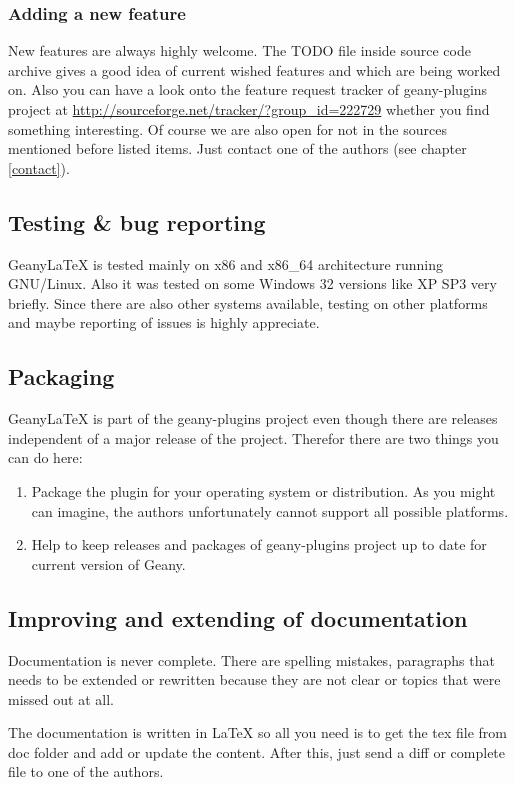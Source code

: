 \documentclass[%
a4paper,%
10pt,%
oneside,%
DIV18,
headsepline,
plainheadsepline,
footsepline,
plainfootsepline,
bibtotoc,%
liststotoc,%
BCOR12mm,%
halfparskip,%
openany,%
]{scrartcl}
\begin{document}
\subsubsection{Adding a new feature}
New features are always highly welcome. The TODO file inside source
code archive gives a good idea of current wished features and which
are being worked on. Also you can have a look onto the feature request
tracker of geany-plugins project at
\url{http://sourceforge.net/tracker/?group\_id=222729} whether you find
something interesting. Of course we are also open for not in the
sources mentioned before listed items. Just contact one of the authors
(see chapter \ref{contact}).

\subsection{Testing \& bug reporting}
Geany\LaTeX{} is tested mainly on x86 and x86\_64 architecture running
GNU/Linux. Also it was tested on some Windows 32 versions like XP SP3
very briefly. Since there are also other systems available, testing on other
platforms and maybe reporting of issues is highly appreciate.

\subsection{Packaging}
Geany\LaTeX{} is part of the geany-plugins project even though there
are releases independent of a major release of the project. Therefor
there are two things you can do here:
\begin{enumerate}
	\item Package the plugin for your operating system or
	distribution. As you might can imagine, the authors unfortunately
	cannot support all possible platforms.
	\item Help to keep releases and packages of geany-plugins project
	up to date for current version of Geany.
\end{enumerate}

\subsection{Improving and extending of documentation}
Documentation is never complete. There are spelling mistakes,
paragraphs that needs to be extended or rewritten because they are not
clear or topics that were missed out at all.

The documentation is written in \LaTeX{} so all you need is to get the
tex file from doc folder and add or update the content.
After this, just send a diff or complete file to one of the authors.
\end{document}
